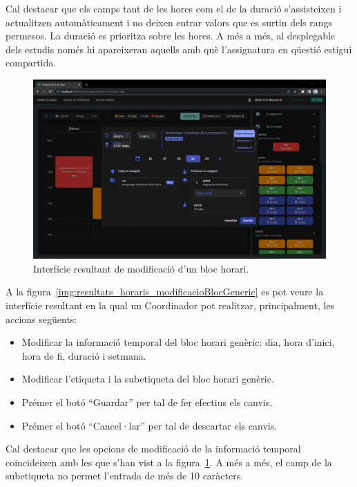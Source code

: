 \documentclass[a4paper,12pt]{ThesisStyle}
\begin{document}
Cal destacar que els camps tant de les hores com el de la duració s'assisteixen i actualitzen automàticament i no deixen entrar valors que es surtin dels rangs permesos. La duració es prioritza sobre les hores. A més a més, al desplegable dels estudis només hi apareixeran aquells amb què l'assignatura en qüestió estigui compartida.

\newpage

\begin{figure}[H]
  \centering
  \includegraphics[width=\textwidth]{assets/results/horaris/modificacioBloc.png}
  \caption{\label{img:resultats_horaris_modificacioBloc}Interfície resultant de modificació d'un bloc horari.}
\end{figure}

\newpage

A la figura~\ref{img:resultats_horaris_modificacioBlocGeneric} es pot veure la interfície resultant en la qual un Coordinador pot realitzar, principalment, les accions següents:
\begin{itemize}
  \item Modificar la informació temporal del bloc horari genèric: dia, hora d'inici, hora de fi, duració i setmana.
  \item Modificar l'etiqueta i la subetiqueta del bloc horari genèric.
  \item Prémer el botó ``Guardar'' per tal de fer efectius els canvis.
  \item Prémer el botó ``Cancel·lar'' per tal de descartar els canvis.
\end{itemize}

Cal destacar que les opcions de modificació de la informació temporal coincideixen amb les que s'han vist a la figura~\ref{img:resultats_horaris_modificacioBloc}. A més a més, el camp de la subetiqueta no permet l'entrada de més de 10 caràcters.
\end{document}
